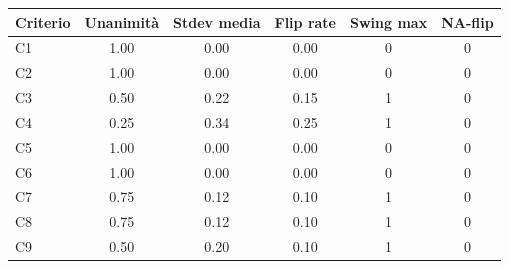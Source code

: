 \begin{tabularx}{\textwidth}{l S[table-format=1.2] S[table-format=1.2] S[table-format=1.2] S[table-format=1.0] S[table-format=2.0]}
  \toprule
  Criterio & {Unanimità} & {Stdev media} & {Flip rate} & {Swing max} & {NA-flip} \\
  \midrule
  C1 & 1.00 & 0.00 & 0.00 & 0 & 0 \\
  C2 & 1.00 & 0.00 & 0.00 & 0 & 0 \\
  C3 & 0.50 & 0.22 & 0.15 & 1 & 0 \\
  C4 & 0.25 & 0.34 & 0.25 & 1 & 0 \\
  C5 & 1.00 & 0.00 & 0.00 & 0 & 0 \\
  C6 & 1.00 & 0.00 & 0.00 & 0 & 0 \\
  C7 & 0.75 & 0.12 & 0.10 & 1 & 0 \\
  C8 & 0.75 & 0.12 & 0.10 & 1 & 0 \\
  C9 & 0.50 & 0.20 & 0.10 & 1 & 0 \\
  \bottomrule
\end{tabularx}
